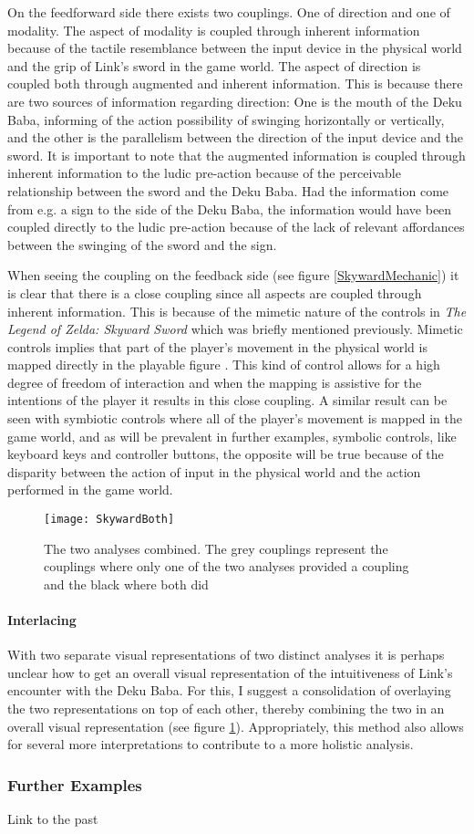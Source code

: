 On the feedforward side there exists two couplings. One of direction and one of modality. The aspect of modality is coupled through inherent information because of the tactile resemblance between the input device in the physical world and the grip of Link's sword in the game world. The aspect of direction is coupled both through augmented and inherent information. This is because there are two sources of information regarding direction: One is the mouth of the Deku Baba, informing of the action possibility of swinging horizontally or vertically, and the other is the parallelism between the direction of the input device and the sword. It is important to note that the augmented information is coupled through inherent information to the ludic pre-action because of the perceivable relationship between the sword and the Deku Baba. Had the information come from e.g. a sign to the side of the Deku Baba, the information would have been coupled directly to the ludic pre-action because of the lack of relevant affordances between the swinging of the sword and the sign.

When seeing the coupling on the feedback side (see figure \ref{SkywardMechanic}) it is clear that there is a close coupling since all aspects are coupled through inherent information. This is because of the mimetic nature of the controls in \textit{The Legend of Zelda: Skyward Sword} which was briefly mentioned previously. Mimetic controls implies that part of the player's movement in the physical world is mapped directly in the playable figure \cite{calleja}. This kind of control allows for a high degree of freedom of interaction and when the mapping is assistive for the intentions of the player it results in this close coupling. A similar result can be seen with symbiotic controls where all of the player's movement is mapped in the game world, and as will be prevalent in further examples, symbolic controls, like keyboard keys and controller buttons, the opposite will be true because of the disparity between the action of input in the physical world and the action performed in the game world.

\begin{figure}[h]
  \texttt{[image: SkywardBoth]}
  \caption{The two analyses combined. The grey couplings represent the couplings where only one of the two analyses provided a coupling and the black where both did}
  \label{SkywardBoth}
\end{figure}

\paragraph{Interlacing}
With two separate visual representations of two distinct analyses it is perhaps unclear how to get an overall visual representation of the intuitiveness of Link's encounter with the Deku Baba. For this, I suggest a consolidation of overlaying the two representations on top of each other, thereby combining the two in an overall visual representation (see figure \ref{SkywardBoth}). Appropriately, this method also allows for several more interpretations to contribute to a more holistic analysis.

\subsubsection{Further Examples}
Link to the past
